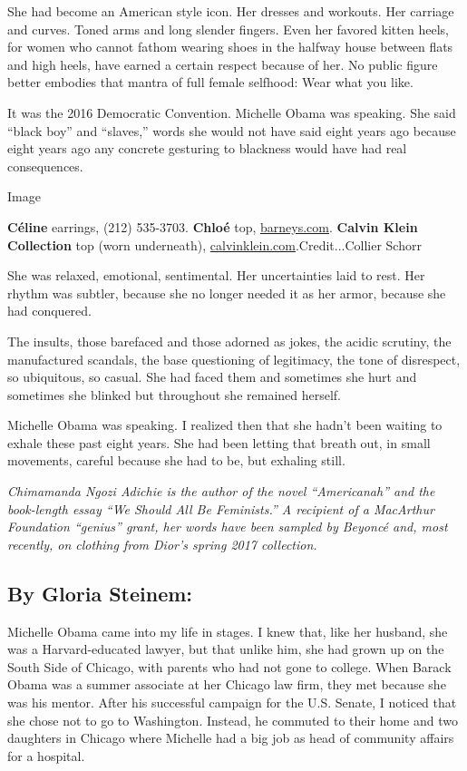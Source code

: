 She had become an American style icon. Her dresses and workouts. Her
carriage and curves. Toned arms and long slender fingers. Even her
favored kitten heels, for women who cannot fathom wearing shoes in the
halfway house between flats and high heels, have earned a certain
respect because of her. No public figure better embodies that mantra of
full female selfhood: Wear what you like.

It was the 2016 Democratic Convention. Michelle Obama was speaking. She
said ``black boy'' and ``slaves,'' words she would not have said eight
years ago because eight years ago any concrete gesturing to blackness
would have had real consequences.

Image

\textbf{Céline} earrings, (212) 535-3703. \textbf{Chloé} top,
\href{http://www.barneys.com/}{barneys.com}. \textbf{Calvin Klein
Collection} top (worn underneath),
\href{http://www.calvinklein.us/}{calvinklein.com}.Credit...Collier
Schorr

She was relaxed, emotional, sentimental. Her uncertainties laid to rest.
Her rhythm was subtler, because she no longer needed it as her armor,
because she had conquered.

The insults, those barefaced and those adorned as jokes, the acidic
scrutiny, the manufactured scandals, the base questioning of legitimacy,
the tone of disrespect, so ubiquitous, so casual. She had faced them and
sometimes she hurt and sometimes she blinked but throughout she remained
herself.

Michelle Obama was speaking. I realized then that she hadn't been
waiting to exhale these past eight years. She had been letting that
breath out, in small movements, careful because she had to be, but
exhaling still.

\emph{Chimamanda Ngozi Adichie is the author of the novel ``Americanah''
and the book-length essay ``We Should All Be Feminists.'' A recipient of
a MacArthur Foundation ``genius'' grant, her words have been sampled by
Beyoncé and, most recently, on clothing from Dior's spring 2017
collection.}

\hypertarget{by-gloria-steinem}{%
\subsection{By Gloria Steinem:}\label{by-gloria-steinem}}

Michelle Obama came into my life in stages. I knew that, like her
husband, she was a Harvard-educated lawyer, but that unlike him, she had
grown up on the South Side of Chicago, with parents who had not gone to
college. When Barack Obama was a summer associate at her Chicago law
firm, they met because she was his mentor. After his successful campaign
for the U.S. Senate, I noticed that she chose not to go to Washington.
Instead, he commuted to their home and two daughters in Chicago where
Michelle had a big job as head of community affairs for a hospital.

